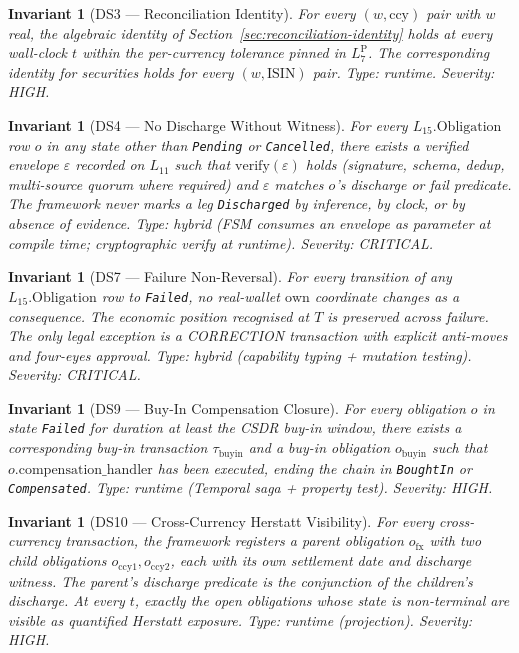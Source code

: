 \documentclass[11pt,a4paper]{article}
\newtheorem{invariant}[definition]{Invariant}
\begin{document}
\begin{invariant}[DS3 --- Reconciliation Identity]
\label{inv:DS3}
For every $(w, \mathrm{ccy})$ pair with $w$ real, the algebraic identity of Section~\ref{sec:reconciliation-identity} holds at every wall-clock $t$ within the per-currency tolerance pinned in $L_7^{\mathrm{P}}$. The corresponding identity for securities holds for every $(w, \mathrm{ISIN})$ pair.
\textit{Type:} runtime. \textit{Severity:} HIGH.
\end{invariant}

\begin{invariant}[DS4 --- No Discharge Without Witness]
\label{inv:DS4}
For every $L_{15}.\mathrm{Obligation}$ row $o$ in any state other than \texttt{Pending} or \texttt{Cancelled}, there exists a verified envelope $\varepsilon$ recorded on $L_{11}$ such that $\mathrm{verify}(\varepsilon)$ holds (signature, schema, dedup, multi-source quorum where required) and $\varepsilon$ matches $o$'s discharge or fail predicate. The framework never marks a leg \texttt{Discharged} by inference, by clock, or by absence of evidence.
\textit{Type:} hybrid (FSM consumes an envelope as parameter at compile time; cryptographic verify at runtime). \textit{Severity:} CRITICAL.
\end{invariant}

\begin{invariant}[DS7 --- Failure Non-Reversal]
\label{inv:DS7}
For every transition of any $L_{15}.\mathrm{Obligation}$ row to \texttt{Failed}, no real-wallet $\mathrm{own}$ coordinate changes as a consequence. The economic position recognised at $T$ is preserved across failure. The only legal exception is a CORRECTION transaction with explicit anti-moves and four-eyes approval.
\textit{Type:} hybrid (capability typing + mutation testing). \textit{Severity:} CRITICAL.
\end{invariant}

\begin{invariant}[DS9 --- Buy-In Compensation Closure]
\label{inv:DS9}
For every obligation $o$ in state \texttt{Failed} for duration at least the CSDR buy-in window, there exists a corresponding buy-in transaction $\tau_{\mathrm{buyin}}$ and a buy-in obligation $o_{\mathrm{buyin}}$ such that $o.\mathrm{compensation\_handler}$ has been executed, ending the chain in \texttt{BoughtIn} or \texttt{Compensated}.
\textit{Type:} runtime (Temporal saga + property test). \textit{Severity:} HIGH.
\end{invariant}

\begin{invariant}[DS10 --- Cross-Currency Herstatt Visibility]
\label{inv:DS10}
For every cross-currency transaction, the framework registers a parent obligation $o_{\mathrm{fx}}$ with two child obligations $o_{\mathrm{ccy1}}, o_{\mathrm{ccy2}}$, each with its own settlement date and discharge witness. The parent's discharge predicate is the conjunction of the children's discharge. At every $t$, exactly the open obligations whose state is non-terminal are visible as quantified Herstatt exposure.
\textit{Type:} runtime (projection). \textit{Severity:} HIGH.
\end{invariant}
\end{document}
